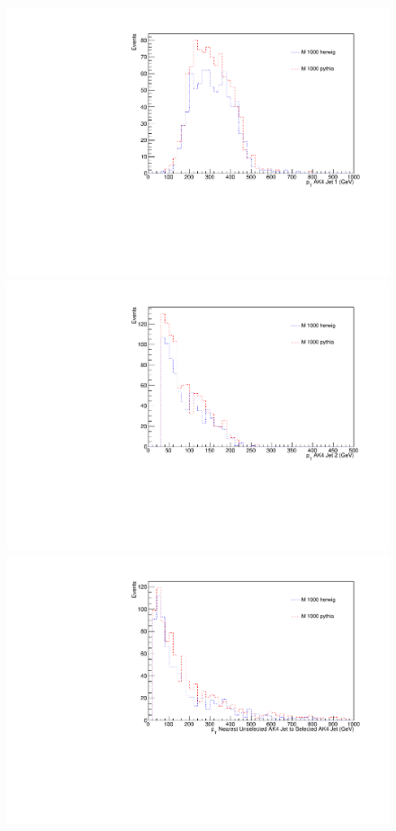 \begin{figure}[thb!]
\begin{center}
\includegraphics[scale=0.34]{Figures/newcutptJ1.pdf}
\includegraphics[scale=0.34]{Figures/newcutptJ2.pdf}\\
\includegraphics[scale=0.34]{Figures/newcutpTAK4AKs.pdf}

\end{center}
\end{figure}
